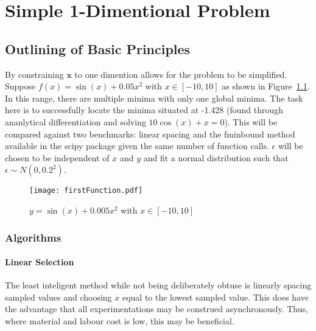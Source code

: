 
\chapter{Simple 1-Dimentional Problem}

\ifpdf
    \graphicspath{{Chapter2/Figs/Raster/}{Chapter2/Figs/PDF/}{Chapter2/Figs/}}
\else
    \graphicspath{{Chapter2/Figs/Vector/}{Chapter2/Figs/}}
\fi


\section{Outlining of Basic Principles}

By constraining $\bm{x}$ to one dimention allows for the problem to be simplified. Suppose ${f(x)=\sin(x)+0.05x^2}$ with ${x\in [-10, 10]}$ as shown in Figure~\ref{fig:firstFunction}. In this range, there are multiple minima with only one global minima. The task here is to successfully locate the minima situated at -1.428 (found through ananlytical differentiation and solving ${10\cos(x)+x=0}$). This will be compared against two benchmarks: linear spacing and the fminbound method available in the scipy package given the same number of function calls. $\epsilon$ will be chosen to be independent of $x$ and $y$ and fit a normal distribution such that ${\epsilon\sim N(0, 0.2^2)}$.

\begin{figure}[htbp!] 
\centering    
\texttt{[image: firstFunction.pdf]}
\caption[First Function]{$y = \sin(x) + 0.005x^2$ with $x\in [-10, 10]$}
\label{fig:firstFunction}
\end{figure}


\subsection{Algorithms}
\subsubsection{Linear Selection}
The least inteligent method while not being deliberately obtuse is linearly spacing sampled values and choosing $x$ equal to the lowest sampled value. This does have the advantage that all experimentations may be construed asynchronously. Thus, where material and labour cost is low, this may be beneficial.
